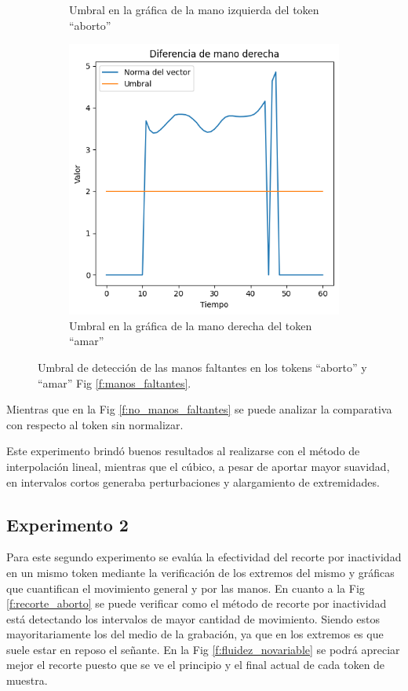 \begin{figure}[t]
\begin{subfigure}[t]{0.3\textwidth}
		\caption{Umbral en la gráfica de la mano izquierda del token ``aborto''}
		\label{f:umbral_lhand_aborto}
	\end{subfigure}
	\begin{subfigure}[t]{0.3\textwidth}
		\centering
		\includegraphics[align=t,width=0.9\linewidth, height =0.9\linewidth]{Graphics/umbral_missing_rhand_amar}
		\caption{Umbral en la gráfica de la mano derecha del token ``amar''}
		\label{f:umbral_rhand_amar}
	\end{subfigure}
	\caption{Umbral de detección de las manos faltantes en los tokens ``aborto'' y ``amar'' Fig \ref{f:manos_faltantes}.}
	\label{f:umbral_deteccion_manos_faltantes}
\end{figure}

Mientras que en la Fig \ref{f:no_manos_faltantes} se puede analizar la comparativa con respecto al token sin normalizar.

Este experimento brindó buenos resultados al realizarse con el método de interpolación lineal, mientras que el cúbico, a pesar de aportar mayor suavidad, en intervalos cortos generaba perturbaciones y alargamiento de extremidades.

\subsection{Experimento 2}
Para este segundo experimento se evalúa la efectividad del recorte por inactividad en un mismo token mediante la verificación de los extremos del mismo y gráficas que cuantifican el movimiento general y por las manos. En cuanto a la Fig \ref{f:recorte_aborto} se puede verificar como el método de recorte por inactividad está detectando los intervalos de mayor cantidad de movimiento. Siendo estos mayoritariamente los del medio de la grabación, ya que en los extremos es que suele estar en reposo el señante. En la Fig \ref{f:fluidez_novariable} se podrá apreciar mejor el recorte puesto que se ve el principio y el final actual de cada token de muestra.



